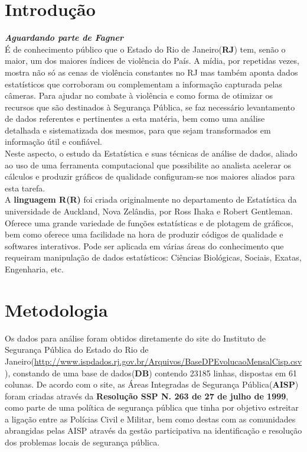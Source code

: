 \documentclass[a4paper, 12pt]{article}
\begin{document}
	\begin{multicols}{2}
		\section{Introdução}
		\large \textbf{\textit{Aguardando parte de Fagner}}\\
		
		É de conhecimento público que o Estado do Rio de Janeiro(\textbf{RJ}) tem, senão o maior, um dos maiores índices de violência do País.  A mídia, por repetidas vezes, mostra não só as cenas de violência constantes no RJ mas também aponta dados estatísticos que corroboram ou complementam a informação capturada pelas câmeras.   Para ajudar no combate à violência e como forma de otimizar os recursos que são destinados à Segurança Pública, se faz necessário levantamento de dados referentes e pertinentes a esta matéria, bem como uma análise detalhada e sistematizada dos mesmos, para que sejam transformados em informação útil e confiável.\\
		
		Neste aspecto, o estudo da Estatística e suas técnicas de análise de dados, aliado ao uso de uma ferramenta computacional que possibilite ao analista acelerar os cálculos e produzir gráficos de qualidade configuram-se nos maiores aliados para esta tarefa.\\
		
		A \textbf{linguagem R(R)} foi criada originalmente no departamento de Estatística da universidade de Auckland, Nova Zelândia, por Ross Ihaka e Robert Gentleman.  Oferece uma grande variedade de funções estatísticas e de plotagem de gráficos, bem como oferece uma facilidade na hora de produzir códigos de qualidade e softwares interativos.  Pode ser aplicada em várias áreas do conhecimento que requeiram manipulação de dados estatísticos:  Ciências Biológicas, Sociais, Exatas, Engenharia, etc. 
		
		\section{Metodologia}
		 Os dados para análise foram obtidos diretamente do site do Instituto de Segurança Pública do Estado do Rio de Janeiro(\url{http://www.ispdados.rj.gov.br/Arquivos/BaseDPEvolucaoMensalCisp.csv}), constando de uma base de dados(\textbf{DB}) contendo 23185 linhas, dispostas em 61 colunas.  De acordo com o site, as Áreas Integradas de Segurança Pública(\textbf{AISP}) foram criadas através da \textbf{Resolução SSP N. 263 de 27 de julho de 1999}, como parte de uma política de segurança pública que tinha por objetivo estreitar a ligação entre as Polícias Civil e Militar, bem como destas com as comunidades abrangidas pelas AISP através da gestão participativa na identificação e resolução dos problemas locais de segurança pública.\\ 
		 

\end{multicols}
\end{document}
